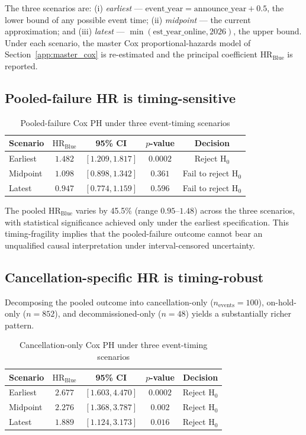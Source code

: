 The three scenarios are: (i) \emph{earliest} --- $\text{event\_year} = \text{announce\_year} + 0.5$, the lower bound of any possible event time; (ii) \emph{midpoint} --- the current approximation; and (iii) \emph{latest} --- $\min(\text{est\_year\_online}, 2026)$, the upper bound. Under each scenario, the master Cox proportional-hazards model of Section~\ref{app:master_cox} is re-estimated and the principal coefficient $\text{HR}_{\text{Blue}}$ is reported.

\subsection*{Pooled-failure HR is timing-sensitive}

\begin{table}[!htbp]
\centering
\caption{Pooled-failure Cox PH under three event-timing scenarios}
\label{tab:app-pijler48-pooled}
\begin{tabular}{lcccc}
\toprule
Scenario & $\text{HR}_{\text{Blue}}$ & 95\% CI & $p$-value & Decision \\
\midrule
Earliest & $1.482$ & $[1.209, 1.817]$ & $0.0002$ & Reject H$_0$ \\
Midpoint & $1.098$ & $[0.898, 1.342]$ & $0.361$ & Fail to reject H$_0$ \\
Latest & $0.947$ & $[0.774, 1.159]$ & $0.596$ & Fail to reject H$_0$ \\
\bottomrule
\end{tabular}
\end{table}

The pooled $\text{HR}_{\text{Blue}}$ varies by 45.5\% (range $0.95$--$1.48$) across the three scenarios, with statistical significance achieved only under the earliest specification. This timing-fragility implies that the pooled-failure outcome cannot bear an unqualified causal interpretation under interval-censored uncertainty.

\subsection*{Cancellation-specific HR is timing-robust}

Decomposing the pooled outcome into cancellation-only ($n_{\text{events}} = 100$), on-hold-only ($n = 852$), and decommissioned-only ($n = 48$) yields a substantially richer pattern.

\begin{table}[!htbp]
\centering
\caption{Cancellation-only Cox PH under three event-timing scenarios}
\label{tab:app-pijler48-cancel}
\begin{tabular}{lcccc}
\toprule
Scenario & $\text{HR}_{\text{Blue}}$ & 95\% CI & $p$-value & Decision \\
\midrule
Earliest & $2.677$ & $[1.603, 4.470]$ & $0.0002$ & Reject H$_0$ \\
Midpoint & $2.276$ & $[1.368, 3.787]$ & $0.002$ & Reject H$_0$ \\
Latest & $1.889$ & $[1.124, 3.173]$ & $0.016$ & Reject H$_0$ \\
\bottomrule
\end{tabular}
\end{table}

